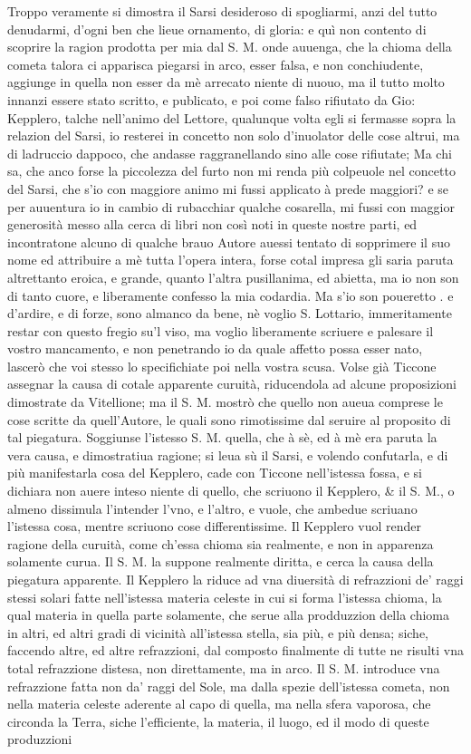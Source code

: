 \documentclass[11pt,twoside,openany]{book}
\begin{document}
Troppo veramente si dimostra il Sarsi desideroso di spogliarmi, anzi del tutto denudarmi, d'ogni ben che lieue ornamento, di gloria: e quì non contento di scoprire la ragion prodotta per mia dal S. M. onde auuenga, che la chioma della cometa talora ci apparisca piegarsi in arco, esser falsa, e non conchiudente, aggiunge in quella non esser da mè arrecato niente di nuouo, ma il tutto molto innanzi essere stato scritto, e publicato, e poi come falso rifiutato da Gio: Kepplero, talche nell'animo del Lettore, qualunque volta egli si fermasse sopra la relazion del Sarsi, io resterei in concetto non solo d'inuolator delle cose altrui, ma di ladruccio dappoco, che andasse raggranellando sino alle cose rifiutate; Ma chi sa, che anco forse la piccolezza del furto non mi renda più colpeuole nel concetto del Sarsi, che s'io con maggiore animo mi fussi applicato à prede maggiori? e se per auuentura io in cambio di rubacchiar qualche cosarella, mi fussi con maggior generosità messo alla cerca di libri non così noti in queste nostre parti, ed incontratone alcuno di qualche brauo Autore auessi tentato di sopprimere il suo nome ed attribuire a mè tutta l'opera intera, forse cotal impresa gli saria paruta altrettanto eroica, e grande, quanto l'altra pusillanima, ed abietta, ma io non son di tanto cuore, e liberamente confesso la mia codardia. Ma s'io son poueretto . e d'ardire, e di forze, sono almanco da bene, nè voglio S. Lottario, immeritamente restar con questo fregio su'l viso, ma voglio liberamente scriuere e palesare il vostro mancamento, e non penetrando io da quale affetto possa esser nato, lascerò che voi stesso lo specifichiate poi nella vostra scusa. Volse già Ticcone assegnar la causa di cotale apparente curuità, riducendola ad alcune proposizioni dimostrate da Vitellione; ma il S. M. mostrò che quello non aueua comprese le cose scritte da quell'Autore, le quali sono rimotissime dal seruire al proposito di tal piegatura. Soggiunse l'istesso S. M. quella, che à sè, ed à mè era paruta la vera causa, e dimostratiua ragione; si leua sù il Sarsi, e volendo confutarla, e di più manifestarla cosa del Kepplero, cade con Ticcone nell'istessa fossa, e si dichiara non auere inteso niente di quello, che scriuono il Kepplero, \& il S. M., o almeno dissimula l'intender l'vno, e l'altro, e vuole, che ambedue scriuano l'istessa cosa, mentre scriuono cose differentissime. Il Kepplero vuol render ragione della curuità, come ch'essa chioma sia realmente, e non in apparenza solamente curua. Il S. M. la suppone realmente diritta, e cerca la causa della piegatura apparente. Il Kepplero la riduce ad vna diuersità di refrazzioni de' raggi stessi solari fatte nell'istessa materia celeste in cui si forma l'istessa chioma, la qual materia in quella parte solamente, che serue alla prodduzzion della chioma in altri, ed altri gradi di vicinità all'istessa stella, sia più, e più densa; siche, faccendo altre, ed altre refrazzioni, dal composto finalmente di tutte ne risulti vna total refrazzione distesa, non direttamente, ma in arco. Il S. M. introduce vna refrazzione fatta non da' raggi del Sole, ma dalla spezie dell'istessa cometa, non nella materia celeste aderente al capo di quella, ma nella sfera vaporosa, che circonda la Terra, siche l'efficiente, la materia, il luogo, ed il modo di queste produzzioni 
\end{document}

